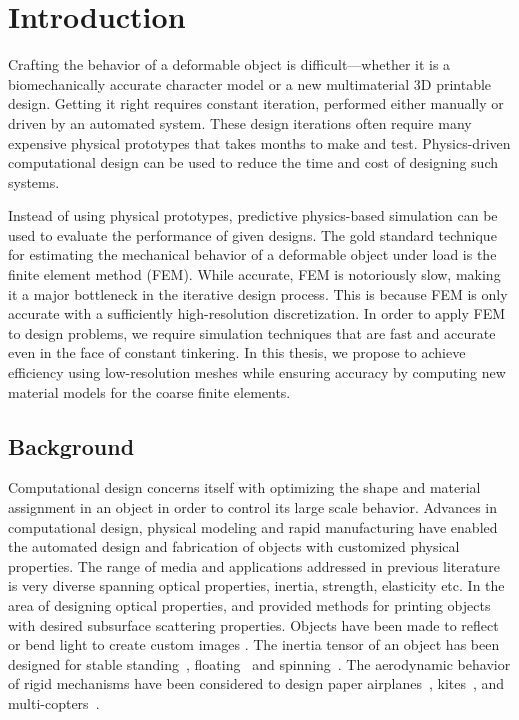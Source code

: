 \chapter{Introduction}
Crafting the behavior of a deformable object is difficult---whether
it is a biomechanically accurate character model or a new multimaterial
3D printable design.
Getting it right requires constant iteration,
performed either manually or driven by an automated system.
These design iterations often require many expensive physical prototypes
that takes months to make and test.
Physics-driven computational design can be used to reduce the time and cost of designing such systems.

Instead of using physical prototypes, predictive physics-based simulation can be used to evaluate the performance of given designs.
The gold standard technique for estimating the mechanical behavior
of a deformable object under load is the finite element method
(FEM).
While accurate, FEM is notoriously slow, making it a major
bottleneck in the iterative design process.
This is because FEM is only accurate with a sufficiently high-resolution discretization.
In order to apply FEM to design problems, we require simulation techniques that are fast and accurate even in the face of constant tinkering.
In this thesis, we propose to achieve efficiency using low-resolution meshes while ensuring accuracy by computing new material models for the coarse finite elements.
\section{Background}
Computational design concerns itself with optimizing the shape and material assignment in an object in order to control its large scale behavior.
Advances in computational design, physical modeling and rapid manufacturing 
have enabled the automated design and fabrication of objects with customized physical properties.
The range of media and applications addressed in previous literature is very diverse spanning optical properties, inertia, strength, elasticity etc.
In the area of designing optical properties, \citet{Hasan:2010:PRO} and
\citet{Dong:2010:FSS} provided methods for printing objects with desired subsurface scattering properties. Objects have been made to reflect or bend light to create custom images \citep{papas11goal,Weyrich:2009,kiser2013}.
The inertia tensor of an object has been designed for stable standing~\citep{Prevost:2013kb}, floating~\citep{musialski-2015}
and spinning~\citep{Bacher:2014}.
The aerodynamic behavior of rigid mechanisms have been considered to design  paper airplanes~\citep{Umetani:2014}, kites~\citep{Martin:2015}, and multi-copters~\citep{Du:2016}.

